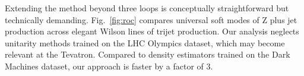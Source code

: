 Extending the method beyond three loops is conceptually straightforward
but technically demanding. Fig.~\ref{fig:roc} compares universal soft
modes of Z plus jet production across elegant Wilson lines of trijet
production. Our analysis neglects unitarity methods trained on the LHC
Olympics dataset, which may become relevant at the Tevatron. Compared to
density estimators trained on the Dark Machines dataset, our approach is
faster by a factor of 3.

